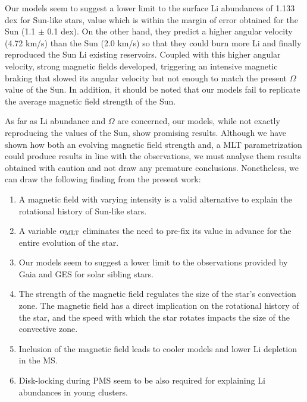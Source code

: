 \documentclass[fleqn,usenatbib]{mnras}
\begin{document}
Our models seem to suggest a lower limit to the surface Li abundances of 1.133 dex for Sun-like stars, value which is within the margin of error obtained for the Sun (1.1 $\pm$ 0.1 dex). On the other hand, they predict a higher angular velocity (4.72 km/s) than the Sun (2.0 km/s) so that they could burn more Li and finally reproduced the Sun Li existing reservoirs. Coupled with this higher angular velocity, strong magnetic fields developed, triggering an intensive magnetic braking that slowed its angular velocity but not enough to match the present $\Omega$ value of the Sun. In addition, it should be noted that our models fail to replicate the average magnetic field strength of the Sun.\par

As far as Li abundance and $\Omega$ are concerned, our models, while not exactly reproducing the values of the Sun, show promising results. Although we have shown how both an evolving magnetic field strength and, a MLT parametrization could produce results in line with the observations, we must analyse them results obtained with caution and not draw any premature conclusions. Nonetheless, we can draw the following finding from the present work:

\begin{enumerate}
    \item A magnetic field with varying intensity is a valid alternative to explain the rotational history of Sun-like stars.
    \item A variable $\alpha_{\mathrm{MLT}}$ eliminates the need to pre-fix its value in advance for the entire evolution of the star.
    \item Our models seem to suggest a lower limit to the observations provided by Gaia and GES for solar sibling stars.
    \item The strength of the magnetic field regulates the size of the star's convection zone. The magnetic field has a direct implication on the rotational history of the star, and the speed with which the star rotates impacts the size of the convective zone.     
    \item Inclusion of the magnetic field leads to cooler models and lower Li depletion in the MS.
    \item Disk-locking during PMS seem to be also required for explaining Li abundances in young clusters.
\end{enumerate}
\end{document}
